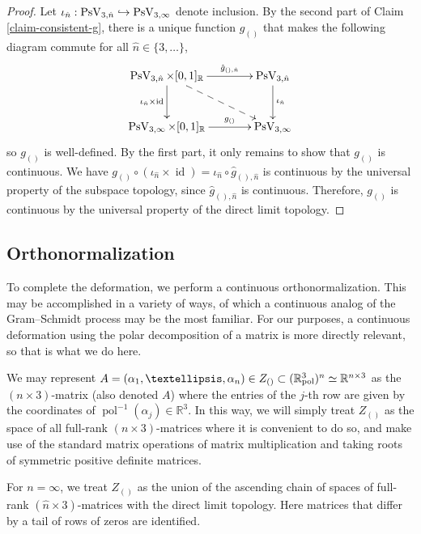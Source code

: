\documentclass[11pt]{article}
\numberwithin{equation}{section}
\newcommand\hto{\mathrel{\lhook\joinrel\to}}
\theoremstyle{remark}
\let\mb\mathbb
\DeclareMathOperator{\pstief}{PsV}
\newcommand{\Rpol}[1]{\mb{R}\mathrlap{{}^{#1}}{}_\text{pol}}
\DeclareMathOperator{\pol}{pol}
\DeclareMathOperator{\id}{id}
\begin{document}
\begin{proof}
Let $\iota_{\hat n} : \pstief_{3,\hat n} \hto \pstief_{3,\infty}$ denote inclusion.
By the second part of Claim \ref{claim-consistent-g}, there is a unique function $g_{()}$ that makes the following diagram commute for all $\hat n \in \{3,\dots\}$,
\[
\begin{array}{c}
\xymatrix@C=1.3cm@R=1cm{
\pstief_{3,\hat n} \times [0,1]_\mb{R}\ar[r]^-{\hat g_{(),\hat n}}\ar[d]_{\iota_{\hat n} \times \id}\ar@{-->}[dr] & \pstief_{3,\hat n}\ar[d]^{\iota_{\hat n}} \\
\pstief_{3,\infty} \times [0,1]_\mb{R}\ar[r]^-{g_{()}} & \pstief_{3,\infty}
}
\end{array}
\]
so $g_{()}$ is well-defined. By the first part, it only remains to show that $g_{()}$ is continuous.
We have $g_{()} \circ (\iota_{\hat n} \times \id) = \iota_{\hat n} \circ \hat g_{(),\hat n}$ is continuous by the universal property of the subspace topology, since $\hat g_{(),\hat n}$ is continuous. Therefore, $g_{()}$ is continuous by the universal property of the direct limit topology.
\end{proof}

\subsection{Orthonormalization}
\label{subsubsec-orth}

To complete the deformation, we perform a continuous orthonormalization. This may be accomplished in a variety of ways, of which a continuous analog of the Gram–Schmidt process may be the most familiar. For our purposes, a continuous deformation using the polar decomposition of a matrix is more directly relevant, so that is what we do here.

We may represent $A = (\alpha_1,\dots,\alpha_n) \in Z_{()} \subset (\Rpol{3})^n \simeq \mb{R}^{n\times 3}$ as the $(n\times 3)$-matrix (also denoted $A$) where the entries of the $j$-th row are given by the coordinates of $\pol^{-1}(\alpha_j) \in \mb{R}^3$.
In this way, we will simply treat $Z_{()}$ as the space of all full-rank $(n\times 3)$-matrices where it is convenient to do so, and make use of the standard matrix operations of matrix multiplication and taking roots of symmetric positive definite matrices.

For $n = \infty$, we treat $Z_{()}$ as the union of the ascending chain of spaces of full-rank $(\hat n\times 3)$-matrices with the direct limit topology. Here matrices that differ by a tail of rows of zeros are identified.
\end{document}
